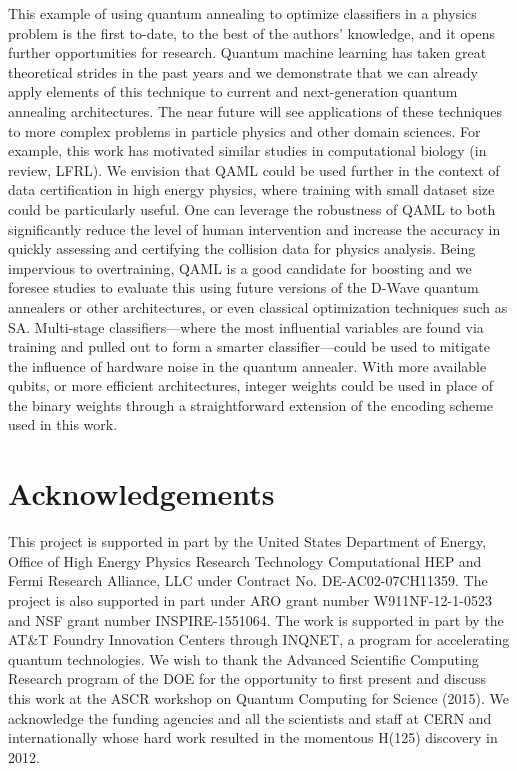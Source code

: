\documentclass[fleqn,10pt]{wlscirep}
\begin{document}
This example of using quantum annealing to optimize classifiers in a physics problem is the first to-date, to the best of the authors' knowledge, and it opens further opportunities for research. Quantum machine learning has taken great theoretical strides in the past years  \cite{Lloyd:2014fk,Wiebe:2014vn,Paparo:2014kx,Rebentrost:2014uq,Schuld:2014eu,Cong:2015zr,Biamonte:2016aa} and we demonstrate that we can already apply elements of this technique to current and next-generation quantum annealing architectures. The near future will see applications of these techniques to more complex problems in particle physics and other domain sciences. For example, this work has motivated similar studies in computational biology (in review, LFRL).%
We envision that QAML could be used further in the context of data certification in high energy physics,
where training with small dataset size could be particularly useful. One can leverage the robustness of QAML to 
both significantly reduce the level of human intervention and increase the accuracy in quickly assessing and certifying the collision data 
for physics analysis. Being impervious to overtraining, QAML is a good candidate for boosting\cite{xgboost}
and we foresee studies to evaluate this using future versions of the D-Wave quantum annealers or other architectures, or even classical optimization techniques such as SA. 
Multi-stage classifiers---where the most influential variables are found via training and pulled out to form a smarter classifier---could be used to mitigate the influence of hardware noise in the quantum annealer.  With more available qubits, or more efficient architectures, integer weights could be used in place of the binary weights through a straightforward extension of the encoding scheme used in this work. 


\section*{Acknowledgements}
This project is supported in part by the  United States Department of Energy, Office of High Energy Physics Research Technology Computational HEP and Fermi Research Alliance, LLC under Contract No. DE-AC02-07CH11359.  The project is also supported in part under ARO grant number W911NF-12-1-0523 and NSF grant number INSPIRE-1551064. The work is supported in part by the AT\&T Foundry Innovation Centers through INQNET, a program for accelerating quantum technologies.  We wish to thank the Advanced Scientific Computing Research program of the DOE for the opportunity to first present and discuss this work at the ASCR workshop on Quantum Computing for Science (2015). We  acknowledge the funding agencies and all the scientists and staff at CERN and internationally whose  hard work resulted in the momentous H(125) discovery in 2012. 
\end{document}
